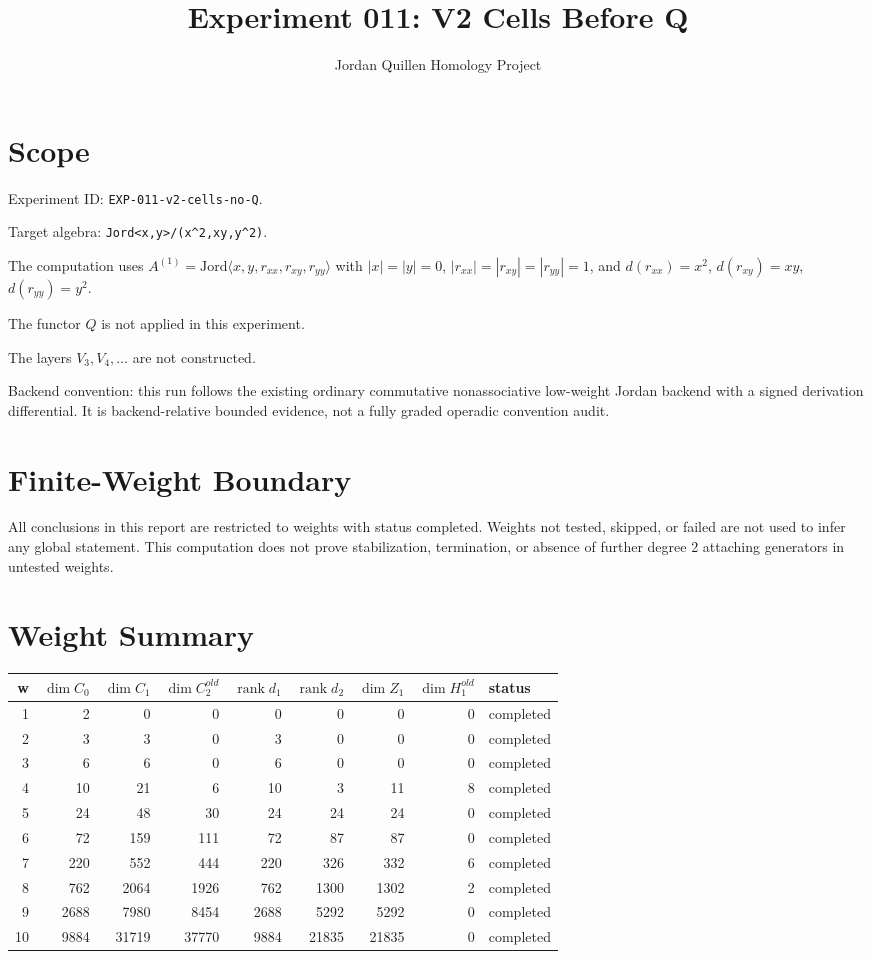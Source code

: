 \documentclass[11pt]{article}
\title{Experiment 011: V2 Cells Before Q}
\author{Jordan Quillen Homology Project}
\date{}
\begin{document}
\maketitle
\section*{Scope}
Experiment ID: \texttt{EXP-011-v2-cells-no-Q}.

Target algebra: \texttt{Jord<x,y>/(x^2,xy,y^2)}.

The computation uses $A^{(1)}=\mathrm{Jord}\langle x,y,r_{xx},r_{xy},r_{yy}\rangle$ with $|x|=|y|=0$, $|r_{xx}|=|r_{xy}|=|r_{yy}|=1$, and $d(r_{xx})=x^2$, $d(r_{xy})=xy$, $d(r_{yy})=y^2$.

The functor $Q$ is not applied in this experiment.

The layers $V_3,V_4,\ldots$ are not constructed.

Backend convention: this run follows the existing ordinary commutative nonassociative low-weight Jordan backend with a signed derivation differential.  It is backend-relative bounded evidence, not a fully graded operadic convention audit.
\section*{Finite-Weight Boundary}
All conclusions in this report are restricted to weights with status completed. Weights not tested, skipped, or failed are not used to infer any global statement. This computation does not prove stabilization, termination, or absence of further degree 2 attaching generators in untested weights.
\section*{Weight Summary}
\begin{longtable}{rrrrrrrrl}
\toprule
w & $\dim C_0$ & $\dim C_1$ & $\dim C_2^{old}$ & $\operatorname{rank} d_1$ & $\operatorname{rank} d_2$ & $\dim Z_1$ & $\dim H_1^{old}$ & status \\
\midrule
1 & 2 & 0 & 0 & 0 & 0 & 0 & 0 & completed \\
2 & 3 & 3 & 0 & 3 & 0 & 0 & 0 & completed \\
3 & 6 & 6 & 0 & 6 & 0 & 0 & 0 & completed \\
4 & 10 & 21 & 6 & 10 & 3 & 11 & 8 & completed \\
5 & 24 & 48 & 30 & 24 & 24 & 24 & 0 & completed \\
6 & 72 & 159 & 111 & 72 & 87 & 87 & 0 & completed \\
7 & 220 & 552 & 444 & 220 & 326 & 332 & 6 & completed \\
8 & 762 & 2064 & 1926 & 762 & 1300 & 1302 & 2 & completed \\
9 & 2688 & 7980 & 8454 & 2688 & 5292 & 5292 & 0 & completed \\
10 & 9884 & 31719 & 37770 & 9884 & 21835 & 21835 & 0 & completed \\
\bottomrule
\end{longtable}
\end{document}
